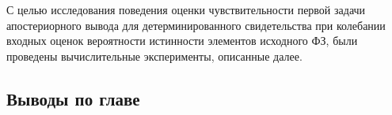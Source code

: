     С целью исследования поведения оценки чувствительности первой задачи апостериорного вывода для детерминированного свидетельства при колебании входных оценок вероятности истинности элементов исходного ФЗ, были проведены вычислительные эксперименты, описанные далее.
    
\subsection{Выводы по главе}